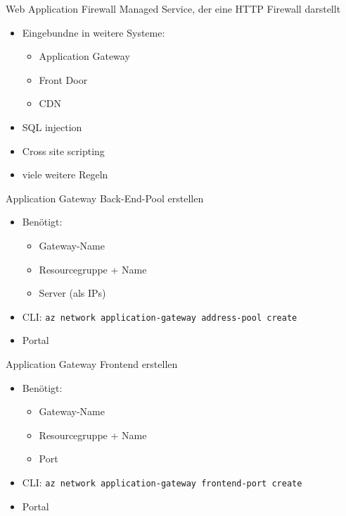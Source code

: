 \begin{flashcard}[Definition]{Web Application Firewall}
    Managed Service, der eine HTTP Firewall darstellt
    \begin{itemize}
        \item Eingebundne in weitere Systeme:
            \begin{itemize}
                \item Application Gateway
                \item Front Door
                \item CDN
            \end{itemize}
        \item SQL injection
        \item Cross site scripting
        \item viele weitere Regeln
    \end{itemize}
\end{flashcard}

\begin{flashcard}[Definition]{Application Gateway Back-End-Pool erstellen}
    \begin{itemize}
        \item Benötigt:
            \begin{itemize}
                \item Gateway-Name
                \item Resourcegruppe + Name
                \item Server (als IPs)
            \end{itemize}
        \item CLI: \texttt{az network application-gateway address-pool create}
        \item Portal
    \end{itemize}
\end{flashcard}

\begin{flashcard}[Definition]{Application Gateway Frontend erstellen}
    \begin{itemize}
        \item Benötigt:
            \begin{itemize}
                \item Gateway-Name
                \item Resourcegruppe + Name
                \item Port
            \end{itemize}
        \item CLI: \texttt{az network application-gateway frontend-port create}
        \item Portal
    \end{itemize}
\end{flashcard}

